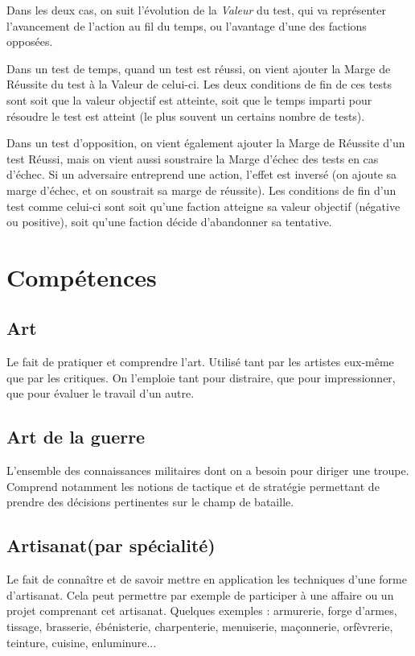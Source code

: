 \documentclass[10pt,a4paper]{book}
\begin{document}
\begin{multicols}{2}
Dans les deux cas, on suit l'évolution de la \emph{Valeur} du test, qui va représenter l'avancement de l'action au fil du temps, ou l'avantage d'une des factions opposées.

Dans un test de temps, quand un test est réussi, on vient ajouter la Marge de Réussite du test à la Valeur de celui-ci. Les deux conditions de fin de ces tests sont soit que la valeur objectif est atteinte, soit que le temps imparti pour résoudre le test est atteint (le plus souvent un certains nombre de tests).

Dans un test d'opposition, on vient également ajouter la Marge de Réussite d'un test Réussi, mais on vient aussi soustraire la Marge d'échec des tests en cas d'échec. Si un adversaire entreprend une action, l'effet est inversé (on ajoute sa marge d'échec, et on soustrait sa marge de réussite). Les conditions de fin d'un test comme celui-ci sont soit qu'une faction atteigne sa valeur objectif (négative ou positive), soit qu'une faction décide d'abandonner sa tentative.
\section{Compétences}
\subsection*{Art} Le fait de pratiquer et comprendre l'art. Utilisé tant par les artistes eux-même que par les critiques. On l'emploie tant pour distraire, que pour impressionner, que pour évaluer le travail d'un autre.
\subsection*{Art de la guerre} L'ensemble des connaissances militaires dont on a besoin pour diriger une troupe. Comprend notamment les notions de tactique et de stratégie permettant de prendre des décisions pertinentes sur le champ de bataille.
\subsection*{Artisanat(par spécialité)} Le fait de connaître et de savoir mettre en application les techniques d'une forme d'artisanat. Cela peut permettre par exemple de participer à une affaire ou un projet comprenant cet artisanat. Quelques exemples : armurerie, forge d'armes, tissage, brasserie, ébénisterie, charpenterie, menuiserie, maçonnerie, orfèvrerie, teinture, cuisine, enluminure...

\end{multicols}
\end{document}

